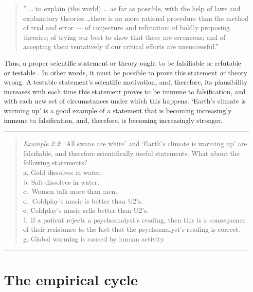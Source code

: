 \documentclass[
]{book}
\begin{document}
\begin{quote}
'' \ldots{} to explain (the world) \ldots{} as far as possible, with the help of laws and explanatory theories \ldots there is no more rational procedure than the method of trial and error --- of conjecture and refutation: of boldly proposing theories; of trying our best to show that these are erroneous; and of accepting them tentatively if our critical efforts are unsuccessful.''
\end{quote}

Thus, a proper scientific statement or theory ought to be falsifiable or refutable or testable \citep{Popp63}. In other words, it must be possible to prove this statement or theory wrong. A testable statement's scientific motivation, and, therefore, its plausibility increases with each time this statement proves to be immune to falsification, and with each new set of circumstances under which this happens. `Earth's climate is warming up' is a good example of a statement that is becoming increasingly immune to falsification, and, therefore, is becoming increasingly stronger.

\begin{center}\rule{0.5\linewidth}{0.5pt}\end{center}

\begin{quote}
\emph{Example 2.2}: `All swans are white' and `Earth's climate is warming up' are falsifiable, and therefore scientifically useful statements. What about the following statements?\\
a. Gold dissolves in water.\\
b. Salt dissolves in water.\\
c.~Women talk more than men.\\
d.~Coldplay's music is better than U2's.\\
e. Coldplay's music sells better than U2's.\\
f.~If a patient rejects a psychoanalyst's reading, then this is a consequence of their resistance to the fact that the psychoanalyst's reading is correct.\\
g. Global warming is caused by human activity.
\end{quote}

\begin{center}\rule{0.5\linewidth}{0.5pt}\end{center}

\section{The empirical cycle}\label{sec:empiricalcycle}
\end{document}
